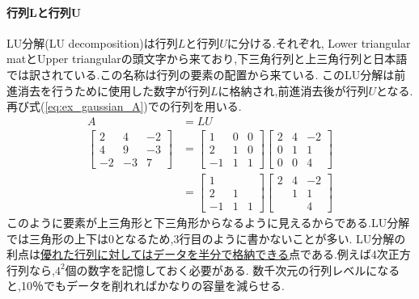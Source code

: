 \paragraph{行列Lと行列U}
LU分解(LU decomposition)は行列$L$と行列$U$に分ける.それぞれ,
Lower triangular matとUpper triangularの頭文字から来ており,下三角行列と上三角行列と日本語では訳されている.この名称は行列の要素の配置から来ている.
このLU分解は前進消去を行うために使用した数字が行列$L$に格納され,前進消去後が行列$U$となる.再び式(\ref{eq:ex_gaussian_A})での行列を用いる.
\begin{align*}
    A &= LU \\
    \begin{bmatrix}
        2 & 4 & -2 \\ 4 & 9 & -3 \\ -2 & -3 & 7
    \end{bmatrix} 
    &=
    \begin{bmatrix}
        1 & 0 & 0 \\ 2 & 1 & 0 \\ -1 & 1 & 1
    \end{bmatrix}
    \begin{bmatrix}
    2& 4 & -2 \\ 0 & 1 & 1 \\ 0 & 0 & 4
    \end{bmatrix} \\
    &=
    \begin{bmatrix}
        1 &  &  \\ 2 & 1 &  \\ -1 & 1 & 1
    \end{bmatrix}
    \begin{bmatrix}
    2& 4 & -2 \\  & 1 & 1 \\  &  & 4
    \end{bmatrix}    
\end{align*}
このように要素が上三角形と下三角形からなるように見えるからである.LU分解では三角形の上下は0となるため,3行目のように書かないことが多い.
LU分解の利点は\underline{優れた行列に対してはデータを半分で格納できる}点である.例えば4次正方行列なら,$4^2$個の数字を記憶しておく必要がある.
数千次元の行列レベルになると,10％でもデータを削れればかなりの容量を減らせる.
